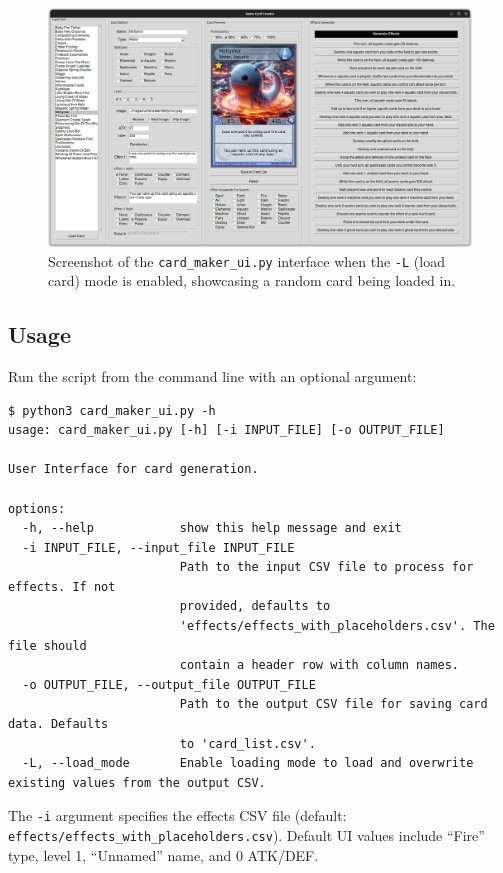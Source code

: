 \begin{figure}[h]
	\centering
	\includegraphics[width=\textwidth]{images/ui_load_mode_sample.png}
	\caption{Screenshot of the \texttt{card\_maker\_ui.py} interface when the \texttt{-L} (load card) mode is enabled, showcasing a random card being loaded in.}
	\label{fig:card_maker_ui_load_mode_screenshot}
\end{figure}


\subsection{Usage}
Run the script from the command line with an optional argument:
\begin{lstlisting}[style=terminalstyle]
$ python3 card_maker_ui.py -h
usage: card_maker_ui.py [-h] [-i INPUT_FILE] [-o OUTPUT_FILE]

User Interface for card generation.

options:
  -h, --help            show this help message and exit
  -i INPUT_FILE, --input_file INPUT_FILE
                        Path to the input CSV file to process for effects. If not
                        provided, defaults to
                        'effects/effects_with_placeholders.csv'. The file should
                        contain a header row with column names.
  -o OUTPUT_FILE, --output_file OUTPUT_FILE
                        Path to the output CSV file for saving card data. Defaults
                        to 'card_list.csv'.
  -L, --load_mode       Enable loading mode to load and overwrite existing values from the output CSV.
\end{lstlisting}
The \texttt{-i} argument specifies the effects CSV file (default: \texttt{effects/effects\_with\_placeholders.csv}). Default UI values include ``Fire'' type, level 1, ``Unnamed'' name, and 0 ATK/DEF.

